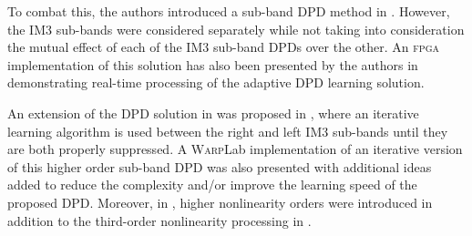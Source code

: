To combat this, the authors introduced a sub-band DPD method in \cite{ICASSP2014}. 
However, the IM3 sub-bands were considered separately while not taking into consideration the mutual effect of each of the IM3 sub-band DPDs over the other. 
An \textsc{fpga} implementation of this solution has also been presented by the authors in \cite{Asilomar2015} demonstrating real-time processing of the adaptive DPD learning solution.

An extension of the DPD solution in \cite{ICASSP2014,Asilomar2015} was proposed in \cite{Tarver16}, where an iterative learning algorithm is used between the right and left IM3 sub-bands until they are both properly suppressed. 
A \textsc{Warp}Lab implementation of an iterative version of this higher order sub-band DPD was also presented  with additional ideas added to reduce the complexity and/or improve the learning speed of the proposed DPD. 
Moreover, in \cite{TMTT_SubbandDPD}, higher nonlinearity orders were introduced in addition to the third-order nonlinearity processing in \cite{ICASSP2014,Asilomar2015}. 

